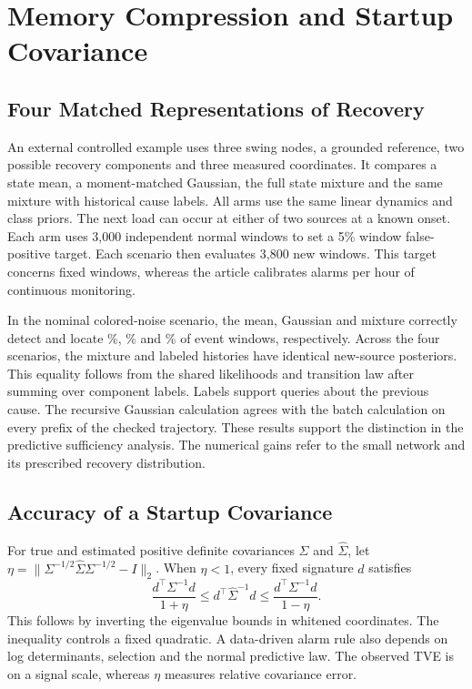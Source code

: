 \section{Memory Compression and Startup Covariance}


\subsection{Four Matched Representations of Recovery}
An external controlled example uses three swing nodes, a grounded
reference, two possible recovery components and three measured coordinates.
It compares a state mean, a moment-matched Gaussian, the full state
mixture and the same mixture with historical cause labels. All arms use
the same linear dynamics and class priors. The next load can occur at
either of two sources at a known onset. Each arm uses 3,000 independent
normal windows to set a 5\% window false-positive target. Each scenario
then evaluates 3,800 new windows. This target concerns fixed windows,
whereas the article calibrates alarms per hour of continuous monitoring.

In the nominal colored-noise scenario, the mean, Gaussian and mixture
correctly detect and locate \MemMean{}\%, \MemMoments{}\% and
\MemMixture{}\% of event windows, respectively. Across the four
scenarios, the mixture and labeled histories have identical new-source
posteriors. This equality follows from the shared likelihoods and
transition law after summing over component labels. Labels support
queries about the previous cause. The recursive Gaussian calculation
agrees with the batch calculation on every prefix of the checked
trajectory. These results support the distinction in the predictive
sufficiency analysis. The numerical gains refer to the small network and
its prescribed recovery distribution.

\subsection{Accuracy of a Startup Covariance}
For true and estimated positive definite covariances $\Sigma$ and
$\widehat\Sigma$, let $\eta=\|\Sigma^{-1/2}\widehat\Sigma
\Sigma^{-1/2}-I\|_2$. When $\eta<1$, every fixed signature $d$ satisfies
\begin{equation}
\frac{d^\top\Sigma^{-1}d}{1+\eta}
\le d^\top\widehat\Sigma^{-1}d
\le\frac{d^\top\Sigma^{-1}d}{1-\eta}.
\end{equation}
This follows by inverting the eigenvalue bounds in whitened coordinates.
The inequality controls a fixed quadratic. A data-driven alarm rule also
depends on log determinants, selection and the normal predictive law.
The observed TVE is on a signal scale, whereas $\eta$ measures relative
covariance error.

